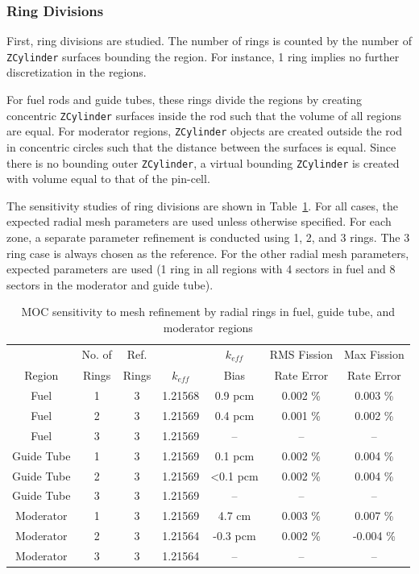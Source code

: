 \subsubsection{Ring Divisions}

First, ring divisions are studied. The number of rings is counted by the number of \texttt{ZCylinder} surfaces bounding the region. For instance, 1 ring implies no further discretization in the regions. 

For fuel rods and guide tubes, these rings divide the regions by creating concentric \texttt{ZCylinder} surfaces inside the rod such that the volume of all regions are equal. For moderator regions, \texttt{ZCylinder} objects are created outside the rod in concentric circles such that the distance between the surfaces is equal. Since there is no bounding outer \texttt{ZCylinder}, a virtual bounding \texttt{ZCylinder} is created with volume equal to that of the pin-cell.

The sensitivity studies of ring divisions are shown in Table~\ref{tab:ring-sensitivity}. For all cases, the expected radial mesh parameters are used unless otherwise specified. For each zone, a separate parameter refinement is conducted using 1, 2, and 3 rings. The 3 ring case is always chosen as the reference. For the other radial mesh parameters, expected parameters are used (1 ring in all regions with 4 sectors in fuel and 8 sectors in the moderator and guide tube).

\begin{table}[ht]
	\centering
	\caption{MOC sensitivity to mesh refinement by radial rings in fuel, guide tube, and moderator regions}
	\medskip
	\begin{tabular}{c|c|c|c|c|c|c}
		\hline
		 & No. of & Ref. & & $k_{\textit{eff}}$ & \ac{RMS} Fission & Max Fission \\
		Region & Rings  & Rings & $k_{\textit{eff}}$ & Bias & Rate Error & Rate Error \\
		\hline
		Fuel & 1 & 3 & 1.21568 & 0.9 pcm  & 0.002 \% & 0.003 \% \\
		Fuel & 2 & 3 & 1.21569 & 0.4 pcm  & 0.001 \% & 0.002 \% \\
		Fuel & 3 & 3 & 1.21569 & -- & -- & -- \\
		\hline
		\hline
		Guide Tube & 1 & 3 & 1.21569 & 0.1 pcm & 0.002 \% & 0.004 \% \\
		Guide Tube & 2 & 3 & 1.21569 & <0.1 pcm  & 0.002 \% & 0.004 \% \\
		Guide Tube & 3 & 3 & 1.21569 & -- & -- & -- \\
		\hline
		\hline
		Moderator & 1 & 3 & 1.21569 & 4.7 cm  & 0.003 \% & 0.007 \% \\
		Moderator & 2 & 3 & 1.21564 & -0.3 pcm  & 0.002 \% & -0.004 \% \\
		Moderator & 3 & 3 & 1.21564 & -- & -- & -- \\
		\hline
	\end{tabular}
	\label{tab:ring-sensitivity}
\end{table}

